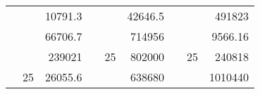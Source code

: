 \begin{table}[H]
\begin{tabular}{|ccrccrccc}
\rowcolor[HTML]{DAE8FC} 
\multicolumn{1}{|c|}{\cellcolor[HTML]{FFFFC7}}                                & \multicolumn{1}{c|}{\cellcolor[HTML]{DAE8FC}}                      & \multicolumn{1}{r|}{\cellcolor[HTML]{DAE8FC}10791.3}   & \multicolumn{1}{c|}{\cellcolor[HTML]{FFFFC7}}                                & \multicolumn{1}{c|}{\cellcolor[HTML]{DAE8FC}}                       & \multicolumn{1}{r|}{\cellcolor[HTML]{DAE8FC}42646.5}   & \multicolumn{1}{c|}{\cellcolor[HTML]{FFFFC7}}                                & \multicolumn{1}{c|}{\cellcolor[HTML]{DAE8FC}}                      & \multicolumn{1}{r|}{\cellcolor[HTML]{DAE8FC}491823}    \\ \cline{3-3} \cline{6-6} \cline{9-9} 
\multicolumn{1}{|c|}{\cellcolor[HTML]{FFFFC7}}                                & \multicolumn{1}{c|}{\cellcolor[HTML]{DAE8FC}}                      & \multicolumn{1}{r|}{\cellcolor[HTML]{DDFDFF}66706.7}   & \multicolumn{1}{c|}{\cellcolor[HTML]{FFFFC7}}                                & \multicolumn{1}{c|}{\cellcolor[HTML]{DAE8FC}}                       & \multicolumn{1}{r|}{\cellcolor[HTML]{DDFDFF}714956}    & \multicolumn{1}{c|}{\cellcolor[HTML]{FFFFC7}}                                & \multicolumn{1}{c|}{\cellcolor[HTML]{DAE8FC}}                      & \multicolumn{1}{r|}{\cellcolor[HTML]{DDFDFF}9566.16}   \\ \cline{3-3} \cline{6-6} \cline{9-9} 
\rowcolor[HTML]{DAE8FC} 
\multicolumn{1}{|c|}{\cellcolor[HTML]{FFFFC7}}                                & \multicolumn{1}{c|}{\cellcolor[HTML]{DAE8FC}}                      & \multicolumn{1}{r|}{\cellcolor[HTML]{DAE8FC}239021}    & \multicolumn{1}{c|}{\cellcolor[HTML]{FFFFC7}}                                & \multicolumn{1}{c|}{\multirow{-9}{*}{\cellcolor[HTML]{DAE8FC}25}}   & \multicolumn{1}{r|}{\cellcolor[HTML]{DAE8FC}802000}    & \multicolumn{1}{c|}{\cellcolor[HTML]{FFFFC7}}                                & \multicolumn{1}{c|}{\multirow{-9}{*}{\cellcolor[HTML]{DAE8FC}25}}  & \multicolumn{1}{r|}{\cellcolor[HTML]{DAE8FC}240818}    \\ \cline{3-3} \cline{5-6} \cline{8-9} 
\multicolumn{1}{|c|}{\cellcolor[HTML]{FFFFC7}}                                & \multicolumn{1}{c|}{\multirow{-10}{*}{\cellcolor[HTML]{DAE8FC}25}} & \multicolumn{1}{r|}{\cellcolor[HTML]{DDFDFF}26055.6}   & \multicolumn{1}{c|}{\cellcolor[HTML]{FFFFC7}}                                & \multicolumn{1}{c|}{\cellcolor[HTML]{DDFDFF}}                       & \multicolumn{1}{r|}{\cellcolor[HTML]{DAE8FC}638680}    & \multicolumn{1}{c|}{\cellcolor[HTML]{FFFFC7}}                                & \multicolumn{1}{c|}{\cellcolor[HTML]{DDFDFF}}                      & \multicolumn{1}{r|}{\cellcolor[HTML]{DAE8FC}1010440}   \\ \cline{2-3} \cline{6-6} \cline{9-9} 

\end{tabular}
\end{table}
